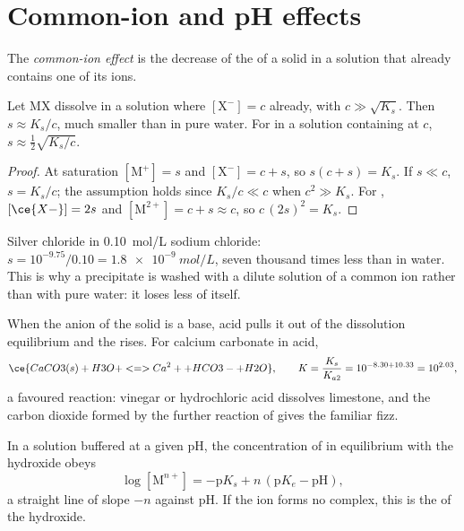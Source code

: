 \section{Common-ion and pH effects}

\begin{definition}\label{def:b1:precipitation:common-ion}
The \emph{common-ion effect} is the decrease of
the  of a solid in a solution that already contains one of its
ions.
\end{definition}

\begin{proposition}\label{prop:b1:precipitation:common-ion}
Let MX dissolve in a solution where $[\mathrm{X}^-] = c$ already, with
$c \gg \sqrt{K_s}$. Then $s \approx K_s/c$, much smaller than in pure
water. For  in a solution containing  at $c$,
$s \approx \frac12\sqrt{K_s/c}$.
\end{proposition}

\begin{proof}
At saturation $[\mathrm{M}^+] = s$ and $[\mathrm{X}^-] = c + s$, so
$s(c + s) = K_s$. If $s \ll c$, $s = K_s/c$; the assumption holds since
$K_s/c \ll c$ when $c^2 \gg K_s$. For , $[\ce{X-}] = 2s$ and
$[\mathrm{M}^{2+}] = c + s \approx c$, so $c\,(2s)^2 = K_s$.
\end{proof}

Silver chloride in \qty{0.10}{mol/L} sodium chloride: $s = 10^{-9.75}/0.10
= \qty{1.8e-9}{mol/L}$, seven thousand times less than in water. This is
why a precipitate is washed with a dilute solution of a common ion rather
than with pure water: it loses less of itself.

When the anion of the solid is a base, acid pulls it out of the
dissolution equilibrium and the  rises. For calcium carbonate in
acid,
\[
  \ce{CaCO3(s) + H3O+ <=> Ca^2+ + HCO3- + H2O}, \qquad
  K = \frac{K_s}{K_{a2}} = 10^{-8.30 + 10.33} = 10^{2.03} ,
\]
a favoured reaction: vinegar or hydrochloric acid dissolves limestone,
and the carbon dioxide formed by the further reaction of
 gives the familiar fizz.

\begin{proposition}\label{prop:b1:precipitation:hydroxide-ph}
In a solution buffered at a given pH, the concentration of  in
equilibrium with the hydroxide  obeys
\[
  \log[\mathrm{M}^{n+}] = -\mathrm{p}K_s + n\,(\mathrm{p}K_e - \mathrm{pH}) ,
\]
a straight line of slope $-n$ against pH. If the ion forms no complex,
this is the  of the hydroxide.
\end{proposition}

